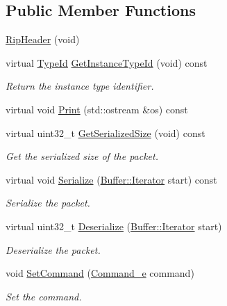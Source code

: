 \subsection*{Public Member Functions}
\begin{DoxyCompactItemize}
\item 
\hyperlink{classns3_1_1RipHeader_af64ff88b7c13e130f06e181c1203bb20}{Rip\+Header} (void)
\item 
virtual \hyperlink{classns3_1_1TypeId}{Type\+Id} \hyperlink{classns3_1_1RipHeader_a1d812dbaee71facb72902a3c8df76c96}{Get\+Instance\+Type\+Id} (void) const 
\begin{DoxyCompactList}\small\item\em Return the instance type identifier. \end{DoxyCompactList}\item 
virtual void \hyperlink{classns3_1_1RipHeader_aa434b71f323d4be9f3375fca06bf9e41}{Print} (std\+::ostream \&os) const 
\item 
virtual uint32\+\_\+t \hyperlink{classns3_1_1RipHeader_ae532554fb15b47003a7b6749038e1d5a}{Get\+Serialized\+Size} (void) const 
\begin{DoxyCompactList}\small\item\em Get the serialized size of the packet. \end{DoxyCompactList}\item 
virtual void \hyperlink{classns3_1_1RipHeader_ae461db58fecca935ddd433d43defde4a}{Serialize} (\hyperlink{classns3_1_1Buffer_1_1Iterator}{Buffer\+::\+Iterator} start) const 
\begin{DoxyCompactList}\small\item\em Serialize the packet. \end{DoxyCompactList}\item 
virtual uint32\+\_\+t \hyperlink{classns3_1_1RipHeader_a92e568c6119343ba9ec17f9aff5c5167}{Deserialize} (\hyperlink{classns3_1_1Buffer_1_1Iterator}{Buffer\+::\+Iterator} start)
\begin{DoxyCompactList}\small\item\em Deserialize the packet. \end{DoxyCompactList}\item 
void \hyperlink{classns3_1_1RipHeader_a8c19b80a57e0f5120e280225cf062b2a}{Set\+Command} (\hyperlink{classns3_1_1RipHeader_a8c6ce779ee35c8b65446aaa202a6e789}{Command\+\_\+e} command)
\begin{DoxyCompactList}\small\item\em Set the command. \end{DoxyCompactList}\item 

\end{DoxyCompactItemize}
